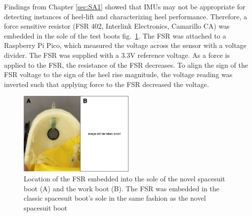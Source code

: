 \documentclass[defaultstyle,11pt]{thesis}
\begin{document}
Findings from Chapter \ref{sec:SA1} showed that IMUs may not be appropriate for detecting instances of heel-lift and characterizing heel performance.
Therefore, a force sensitive resistor (FSR 402, Interlink Electronics, Camarillo CA) was embedded in the sole of the test boots fig.~\ref{fig:SA4-FSRembed}.
The FSR was attached to a Raspberry Pi Pico, which measured the voltage across the sensor with a voltage divider.
The FSR was supplied with a 3.3V reference voltage.
As a force is applied to the FSR, the resistance of the FSR decreases.
To align the sign of the FSR voltage to the sign of the heel rise magnitude, the voltage reading was inverted such that applying force to the FSR decreased the voltage.

\begin{figure}
\hypertarget{fig:SA4-FSRembed}{%
\centering
\includegraphics[width=0.5\textwidth,height=\textheight]{../fig/SA4/FSR_embed.png}
\caption{Location of the FSR embedded into the sole of the novel spacesuit boot (A) and the work boot (B). The FSR was embedded in the classic spacesuit boot's sole in the same fashion as the novel spacesuit boot}\label{fig:SA4-FSRembed}
}
\end{figure}
\end{document}
